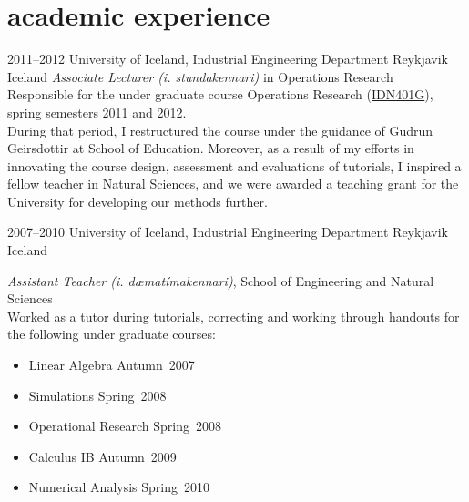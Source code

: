 \documentclass[]{cv} %
\begin{document}
\section{academic experience}
\begin{entrylist}
    \entry
    {2011--2012}
    {University of Iceland, Industrial Engineering Department}
    {Reykjavik Iceland}
    {\emph{Associate Lecturer (i. stundakennari)} in Operations Research \\
        Responsible for the under graduate course Operations Research 
        (\href{https://ugla.hi.is/kennsluskra/index.php?sid=&tab=nam&chapter=namskeid&id=08213020110}{IDN401G}),
         spring semesters 2011 and 2012. \\
        During that period, I restructured the course under the guidance of 
        Gudrun Geirsdottir at School of Education. Moreover, as a result of my 
        efforts in innovating the course design, assessment and evaluations of 
        tutorials, I inspired a fellow teacher in Natural Sciences, and we were 
        awarded a teaching grant for the University for developing our methods 
        further.
    }
\end{entrylist}
\begin{entrylist}
    \entry
    {2007--2010}
    {University of Iceland, Industrial Engineering Department}
    {Reykjavik Iceland}
    {\emph{Assistant Teacher (i. dæmatímakennari)}, School of Engineering and 
    Natural Sciences \\
        Worked as a tutor during tutorials, correcting and working through 
        handouts for the following under graduate courses: 
        \begin{itemize}
            \item Linear Algebra 		\hfill Autumn~2007
            \item Simulations			\hfill Spring~2008
            \item Operational Research 	\hfill Spring~2008
            \item Calculus IB			\hfill Autumn~2009
            \item Numerical Analysis 	\hfill Spring~2010
        \end{itemize}	
    }
\end{entrylist}   
\end{document}
